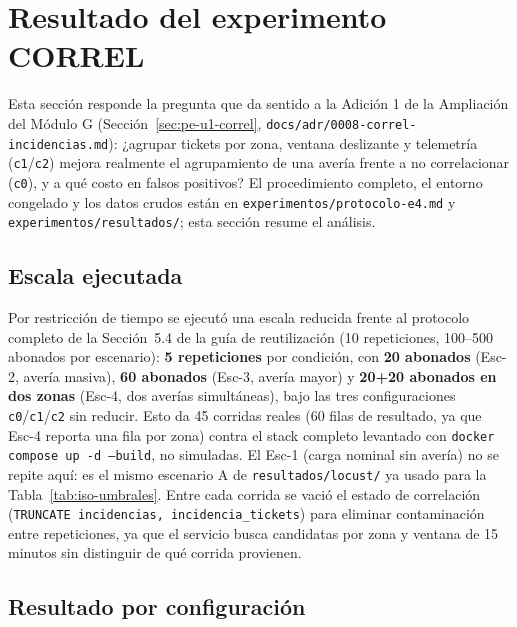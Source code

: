 \section{Resultado del experimento CORREL}
\label{sec:resultado-correl}

Esta sección responde la pregunta que da sentido a la Adición 1 de la Ampliación del Módulo G
(Sección~\ref{sec:pe-u1-correl}, \texttt{docs/adr/0008-correl-incidencias.md}): ¿agrupar tickets
por zona, ventana deslizante y telemetría (\texttt{c1}/\texttt{c2}) mejora realmente el
agrupamiento de una avería frente a no correlacionar (\texttt{c0}), y a qué costo en falsos
positivos? El procedimiento completo, el entorno congelado y los datos crudos están en
\texttt{experimentos/protocolo-e4.md} y \texttt{experimentos/resultados/}; esta sección resume
el análisis.

\subsection{Escala ejecutada}

Por restricción de tiempo se ejecutó una escala reducida frente al protocolo completo de la
Sección~5.4 de la guía de reutilización (10 repeticiones, 100--500 abonados por escenario):
\textbf{5 repeticiones} por condición, con \textbf{20 abonados} (Esc-2, avería masiva),
\textbf{60 abonados} (Esc-3, avería mayor) y \textbf{20+20 abonados en dos zonas} (Esc-4, dos
averías simultáneas), bajo las tres configuraciones \texttt{c0}/\texttt{c1}/\texttt{c2} sin
reducir. Esto da 45 corridas reales (60 filas de resultado, ya que Esc-4 reporta una fila por
zona) contra el stack completo levantado con \texttt{docker compose up -d --build}, no
simuladas. El Esc-1 (carga nominal sin avería) no se repite aquí: es el mismo escenario A de
\texttt{resultados/locust/} ya usado para la Tabla~\ref{tab:iso-umbrales}. Entre
cada corrida se vació el estado de correlación (\texttt{TRUNCATE incidencias,
incidencia\_tickets}) para eliminar contaminación entre repeticiones, ya que el servicio busca
candidatas por zona y ventana de 15 minutos sin distinguir de qué corrida provienen.

\subsection{Resultado por configuración}



